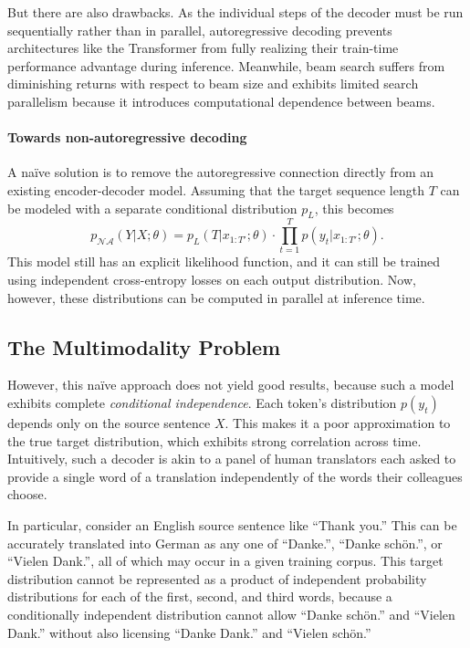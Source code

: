 \documentclass{article} \usepackage{iclr2018_conference,times}
\begin{document}
But there are also drawbacks. As the individual steps of the decoder must be run sequentially rather than in parallel, autoregressive decoding prevents architectures like the Transformer from fully realizing their train-time performance advantage during inference. Meanwhile, beam search suffers from diminishing returns with respect to beam size \citep{koehn2017six} and exhibits limited search parallelism because it introduces computational dependence between beams.

\vspace{-5pt}
\paragraph{Towards non-autoregressive decoding}
A na\"{i}ve solution is to remove the autoregressive connection directly from an existing encoder-decoder model. Assuming that the target sequence length $T$ can be modeled with a separate conditional distribution $p_L$, this becomes
\begin{equation}
p_{\mathcal{NA}}(Y|X; \theta) = p_L(T|x_{1:T'};\theta)\cdot \prod_{t=1}^T p(y_t| x_{1:T'};\theta).
\label{eq.simple}
\end{equation}
This model still has an explicit likelihood function, and it can still be trained using independent cross-entropy losses on each output distribution. Now, however, these distributions can be computed in parallel at inference time. 

\subsection{The Multimodality Problem}
However, this na\"{i}ve approach does not yield good results, because such a model exhibits complete \emph{conditional independence}.
Each token's distribution $p(y_t)$  depends only on the source sentence $X$. 
This makes it a poor approximation to the true target distribution, which exhibits strong correlation across time. 
Intuitively, such a decoder is akin to a panel of human translators each asked to provide a single word of a translation independently of the words their colleagues choose.

In particular, consider an English source sentence like ``Thank you.'' This can be accurately translated into German as any one of ``Danke.'', ``Danke sch\"{o}n.'', or ``Vielen Dank.'', all of which may occur in a given training corpus. This target distribution cannot be represented as a product of independent probability distributions for each of the first, second, and third words, because a conditionally independent distribution cannot allow ``Danke sch\"{o}n.'' and ``Vielen Dank.'' without also licensing ``Danke Dank.'' and ``Vielen sch\"{o}n.''
\end{document}
